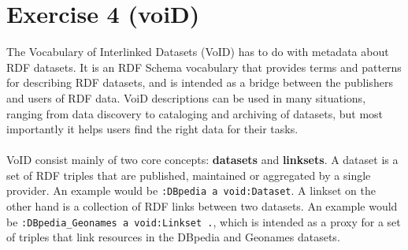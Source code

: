 \documentclass[paper=a4, fontsize=12pt]{scrartcl} %
\begin{document}

\section{Exercise 4 (voiD)}

The Vocabulary of Interlinked Datasets (VoID) has to do with metadata about RDF datasets. It is an RDF Schema vocabulary that provides terms and patterns for describing RDF datasets, and is intended as a bridge between the publishers and users of RDF data. VoiD descriptions can be used in many situations, ranging from data discovery to cataloging and archiving of datasets, but most importantly it helps users find the right data for their tasks.\\
\\
VoID consist mainly of two core concepts: \textbf{datasets} and \textbf{linksets}. A dataset is a set of RDF triples that are published, maintained or aggregated by a single provider. An example would be \texttt{:DBpedia a void:Dataset}. A linkset on the other hand is a collection of RDF links between two datasets. An example would be \texttt{:DBpedia\_Geonames a void:Linkset .}, which is intended as a proxy for a set of triples that link resources in the DBpedia and Geonames datasets. 
\end{document}
